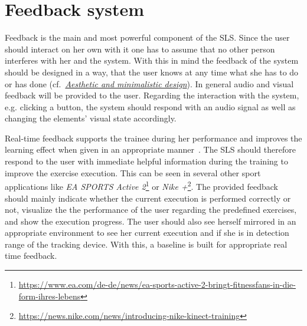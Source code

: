 \section{Feedback system}\label{4_5_feedbackSystem}



Feedback is the main and most powerful component of the SLS. Since the user should interact on her own with it one has to assume that no other person interferes with her and the system. With this in mind the feedback of the system should be designed in a way, that the user knows at any time what she has to do or has done (cf.~\textit{\hyperref[nielsenDesignPrinciples]{Aesthetic and minimalistic design}}). In general audio and visual feedback will be provided to the user. Regarding the interaction with the system, e.g. clicking a button, the system should respond with an audio signal as well as changing the elements' visual state accordingly.

Real-time feedback supports the trainee during her performance and improves the learning effect when given in an appropriate manner~\cite{Hodges2002-gb, Liebermann2002-zr, Winstein1990-to}. The SLS should therefore respond to the user with immediate helpful information during the training to improve the exercise execution. This can be seen in several other sport applications like \textit{EA SPORTS Active 2}\footnote{\url{https://www.ea.com/de-de/news/ea-sports-active-2-bringt-fitnessfans-in-die-form-ihres-lebens}} or \textit{Nike +}\footnote{\url{https://news.nike.com/news/introducing-nike-kinect-training}}. The provided feedback should mainly indicate whether the current execution is performed correctly or not, visualize the the performance of the user regarding the predefined exercises, and show the execution progress. The user should also see herself mirrored in an appropriate environment to see her current execution and if she is in detection range of the tracking device. With this, a baseline is built for appropriate real time feedback.

